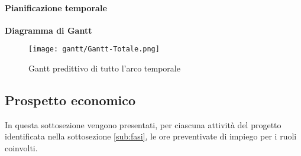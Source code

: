 \documentclass{scalatekids-article}
\begin{document}
\newpage
\paragraph{Pianificazione temporale}
\textbf{Diagramma di Gantt}
\begin{figure}[H]
  \texttt{[image: gantt/Gantt-Totale.png]}
  \caption{Gantt predittivo di tutto l'arco temporale}
\end{figure}

\newpage
\subsection{Prospetto economico}
In questa sottosezione vengono presentati, per ciascuna attività del progetto identificata
nella sottosezione \ref{sub:fasi}, le ore preventivate di impiego per i ruoli coinvolti.
\end{document}
